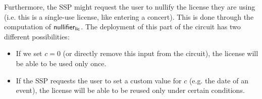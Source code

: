 Furthermore, the SSP might request the user to nullify the license they are using (i.e. this is a single-use license, like entering a concert). This is done through the computation of $\mathsf{nullifier_{lic}}$. The deployment of this part of the circuit has two different possibilities:
\begin{itemize}
	\item If we set $c = 0$ (or directly remove this input from the circuit), the license will be able to be used only once.
	\item If the SSP requests the user to set a custom value for $c$ (e.g. the date of an event), the license will be able to be reused only under certain conditions.
\end{itemize}

